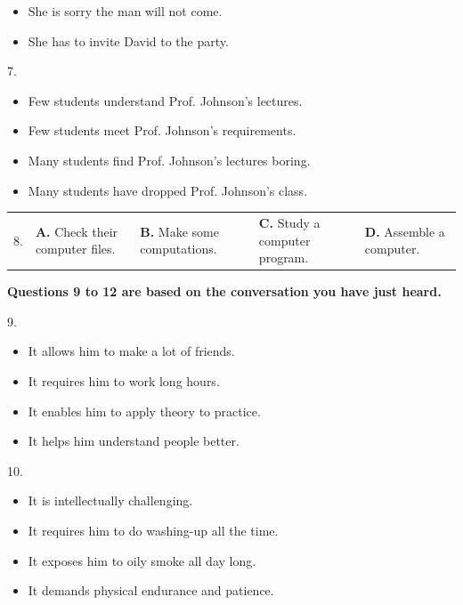 \documentclass[UTF8,11pt]{ctexart}
\begin{document}
\begin{itemize}[leftmargin=2em,itemsep=.2em,topsep=.4em]\item[B.] She is sorry the man will not come.
\item[D.] She has to invite David to the party.
\end{itemize}

7.


\begin{itemize}[leftmargin=2em,itemsep=.2em,topsep=.4em]\item[A.] Few students understand Prof. Johnson’s lectures.
\item[B.] Few students meet Prof. Johnson’s requirements.
\item[C.] Many students find Prof. Johnson’s lectures boring.
\end{itemize}

\begin{itemize}[leftmargin=2em,itemsep=.2em,topsep=.4em]\item[D.] Many students have dropped Prof. Johnson’s class.
\end{itemize}

\noindent\begin{tabularx}{\linewidth}{@{}lXXXX@{}}8. & \textbf{A.} Check their computer files. & \textbf{B.} Make some computations. & \textbf{C.} Study a computer program. & \textbf{D.} Assemble a computer.\\\end{tabularx}\par

\textbf{Questions 9 to 12 are based on the conversation you have just heard.}


9.


\begin{itemize}[leftmargin=2em,itemsep=.2em,topsep=.4em]\item[A.] It allows him to make a lot of friends.
\item[B.] It requires him to work long hours.
\item[C.] It enables him to apply theory to practice.
\item[D.] It helps him understand people better.
\end{itemize}

10.


\begin{itemize}[leftmargin=2em,itemsep=.2em,topsep=.4em]\item[A.] It is intellectually challenging.
\item[B.] It requires him to do washing-up all the time.
\item[C.] It exposes him to oily smoke all day long.
\item[D.] It demands physical endurance and patience.
\end{itemize}
\end{document}
